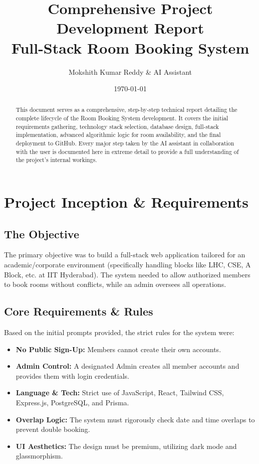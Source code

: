 \documentclass[12pt, a4paper]{report}
\title{\Huge{\textbf{Comprehensive Project Development Report}} \\ \vspace{0.5cm} \Large{\textbf{Full-Stack Room Booking System}}}
\author{Mokshith Kumar Reddy \& AI Assistant}
\date{\today}
\begin{document}
\maketitle

\begin{abstract}
This document serves as a comprehensive, step-by-step technical report detailing the complete lifecycle of the Room Booking System development. It covers the initial requirements gathering, technology stack selection, database design, full-stack implementation, advanced algorithmic logic for room availability, and the final deployment to GitHub. Every major step taken by the AI assistant in collaboration with the user is documented here in extreme detail to provide a full understanding of the project's internal workings.
\end{abstract}

\tableofcontents
\newpage

\chapter{Project Inception \& Requirements}

\section{The Objective}
The primary objective was to build a full-stack web application tailored for an academic/corporate environment (specifically handling blocks like LHC, CSE, A Block, etc. at IIT Hyderabad). The system needed to allow authorized members to book rooms without conflicts, while an admin oversees all operations.

\section{Core Requirements \& Rules}
Based on the initial prompts provided, the strict rules for the system were:
\begin{itemize}
    \item \textbf{No Public Sign-Up:} Members cannot create their own accounts.
    \item \textbf{Admin Control:} A designated Admin creates all member accounts and provides them with login credentials.
    \item \textbf{Language \& Tech:} Strict use of JavaScript, React, Tailwind CSS, Express.js, PostgreSQL, and Prisma.
    \item \textbf{Overlap Logic:} The system must rigorously check date and time overlaps to prevent double booking.
    \item \textbf{UI Aesthetics:} The design must be premium, utilizing dark mode and glassmorphism.
\end{itemize}
\end{document}
